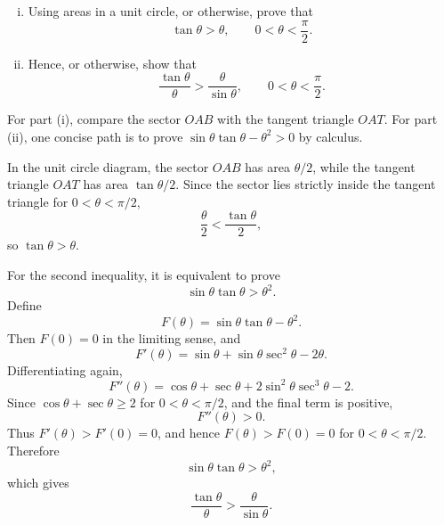 \begin{problem}
\begin{enumerate}[(i)]
  \item Using areas in a unit circle, or otherwise, prove that
  \[
  \tan\theta>\theta,
  \qquad 0<\theta<\frac{\pi}{2}.
  \]
  \item Hence, or otherwise, show that
  \[
  \frac{\tan\theta}{\theta}
  >
  \frac{\theta}{\sin\theta},
  \qquad 0<\theta<\frac{\pi}{2}.
  \]
\end{enumerate}

\begin{center}
\end{center}
\end{problem}

\begin{hintbox}
For part (i), compare the sector $OAB$ with the tangent triangle $OAT$. For
part (ii), one concise path is to prove
$\sin\theta\tan\theta-\theta^2>0$ by calculus.
\end{hintbox}

\begin{solution}
In the unit circle diagram, the sector $OAB$ has area $\theta/2$, while the
tangent triangle $OAT$ has area $\tan\theta/2$. Since the sector lies strictly
inside the tangent triangle for $0<\theta<\pi/2$,
\[
\frac{\theta}{2}<\frac{\tan\theta}{2},
\]
so $\tan\theta>\theta$.

For the second inequality, it is equivalent to prove
\[
\sin\theta\tan\theta>\theta^2.
\]
Define
\[
F(\theta)=\sin\theta\tan\theta-\theta^2.
\]
Then $F(0)=0$ in the limiting sense, and
\[
F'(\theta)=\sin\theta+\sin\theta\sec^2\theta-2\theta.
\]
Differentiating again,
\[
F''(\theta)
=\cos\theta+\sec\theta+2\sin^2\theta\sec^3\theta-2.
\]
Since $\cos\theta+\sec\theta\ge2$ for $0<\theta<\pi/2$, and the final term is
positive,
\[
F''(\theta)>0.
\]
Thus $F'(\theta)>F'(0)=0$, and hence $F(\theta)>F(0)=0$ for
$0<\theta<\pi/2$. Therefore
\[
\sin\theta\tan\theta>\theta^2,
\]
which gives
\[
\frac{\tan\theta}{\theta}>\frac{\theta}{\sin\theta}.
\]
\end{solution}


